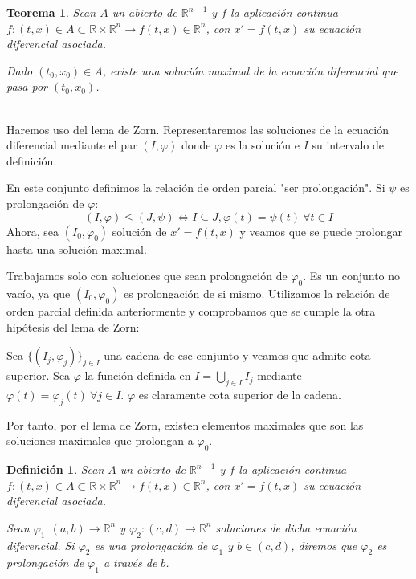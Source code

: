 \documentclass[11pt, a4paper,twoside]{article}
\makeatletter
\newcommand{\iindex}[1]{\emph{#1}\index{#1}}
\theoremstyle{theorem-style}  %
\newtheorem{theorem}{Teorema}[section]  %
\renewenvironment{proof}[1][\proofname]{\par
	\pushQED{\qed}%
	\normalfont \topsep6\p@\@plus6\p@\relax
	\list{}{%
		\settowidth{\leftmargin}{\quad:\hskip\labelsep}%
		\setlength{\labelwidth}{0pt}%
		\setlength{\itemindent}{-\leftmargin}%
	}%
	\item[\hskip\labelsep\itshape#1\@addpunct{:}]\ignorespaces
}{%
	\popQED\endlist\@endpefalse
}
\theoremstyle{definition-style}
\newtheorem{definition}{Definición}[section]
\theoremstyle{example-style}
\makeatother
\begin{document}
\begin{theorem}
	Sean $ A $ un abierto de $ \mathbb{R}^{n+1} $ y $ f $ la aplicación continua $ f:(t,x)\in A\subset \mathbb{R}\times \mathbb{R}^n \longrightarrow f(t,x)\in \mathbb{R}^n $, con $  x'=f(t,x) $ su ecuación diferencial asociada. 
	
	Dado $ (t_0,x_0)\in A $, existe una solución maximal de la ecuación diferencial que pasa por $ (t_0,x_0) $.
	
\end{theorem}
\begin{proof} \ \\	
	Haremos uso del lema de Zorn. Representaremos las soluciones de la ecuación diferencial mediante el par $ (I,\varphi) $ donde $ \varphi $ es la solución e $ I $ su intervalo de definición.
	
	En este conjunto definimos la relación de orden parcial "ser prolongación". Si $ \psi $ es prolongación de $ \varphi $:
	\[ (I,\varphi)\leq (J,\psi)\Leftrightarrow I\subseteq J, \varphi(t)=\psi(t) \ \forall t \in I \]
	Ahora, sea $ (I_0,\varphi_0) $ solución de $ x'=f(t,x) $ y veamos que se puede prolongar hasta una solución maximal.
	
	Trabajamos solo con soluciones que sean prolongación de $ \varphi_0 $. Es un conjunto no vacío, ya que $ (I_0,\varphi_0) $ es prolongación de si mismo. Utilizamos la relación de orden parcial definida anteriormente y comprobamos que se cumple la otra hipótesis del lema de Zorn:
	
	Sea $ \{(I_j,\varphi_j) \}_{j\in I} $ una cadena de ese conjunto y veamos que admite cota superior. Sea $ \varphi $ la función definida en $ I=\bigcup_{j\in I}I_j $ mediante $ \varphi(t)=\varphi_j(t) \ \forall j \in I $. $ \varphi $ es claramente cota superior de la cadena.
	
	Por tanto, por el lema de Zorn, existen elementos maximales que son las soluciones maximales que prolongan a $ \varphi_0 $.	
\end{proof}
\begin{definition}
	Sean $ A $ un abierto de $ \mathbb{R}^{n+1} $ y $ f $ la aplicación continua $ f:(t,x)\in A\subset \mathbb{R}\times \mathbb{R}^n \longrightarrow f(t,x)\in \mathbb{R}^n $, con $  x'=f(t,x) $ su ecuación diferencial asociada. 
	
	Sean $ \varphi_1:(a,b)\longrightarrow \mathbb{R}^n $ y $ \varphi_2:(c,d)\longrightarrow \mathbb{R}^n $ soluciones de dicha ecuación diferencial. Si $ \varphi_2 $ es una prolongación de $ \varphi_1 $ y $ b\in(c,d) $, diremos que $ \varphi_2 $ es \iindex{prolongación de $ \varphi_1 $ a través de $ b $}.
\end{definition}
\end{document}
